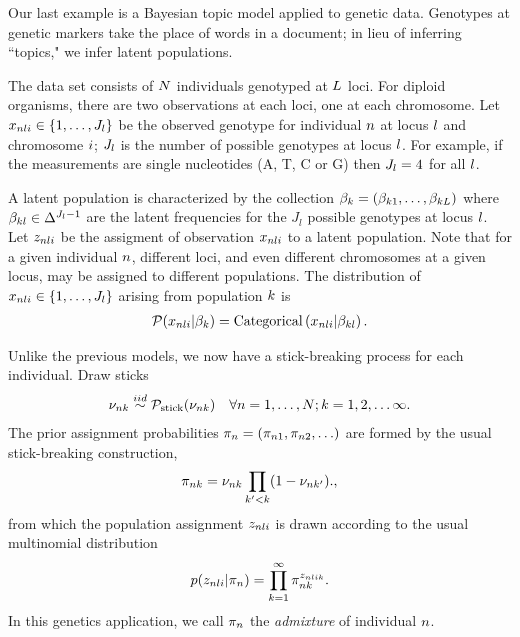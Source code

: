 
Our last example is a Bayesian topic model applied to genetic data.
Genotypes at genetic markers take the place of
words in a document; in lieu of inferring ``topics," we infer latent populations.

\begin{ex}

The data set consists of $N$ individuals genotyped at $L$ loci.
For diploid organisms, there are two observations at each loci, one at each chromosome.
Let $x_{nli}\in\{1, \ldots, J_l\}$ be the observed genotype for
individual $n$ at locus $l$ and chromosome $i$;
$J_l$ is the number of possible genotypes at locus $l$.
For example, if the measurements are single nucleotides (A, T, C or G)
then $J_l = 4$ for all $l$.

A latent population is characterized by the collection
$\beta_k = (\beta_{k1}, \ldots, \beta_{kL})$ where
$\beta_{kl}\in\Delta^{J_l - 1}$ are the latent frequencies for the $J_l$
possible genotypes at locus $l$.
Let $z_{nli}$ be the assigment of observation $x_{nli}$ to a latent population.
Note that for a given individual $n$,
different loci, and even different chromosomes at a given locus,
may be assigned to different populations.
The distribution of $x_{nli}\in\{1, \ldots, J_l\}$ arising from population $k$ is
\begin{align*}
\mathcal{P}(x_{nli} \vert \beta_{k}) =
\mathrm{Categorical}\left(x_{nli}\vert \beta_{kl}\right).
\end{align*}


Unlike the previous models, we now have a stick-breaking process for each individual.
Draw sticks
\begin{align*}
\nu_{nk} \overset{iid}{\sim} \mathcal{P}_{\mathrm{stick}}(\nu_{nk}) \quad \forall n = 1, \ldots, N; k = 1, 2, \ldots \infty.
\end{align*}
The prior assignment probabilities
$\pi_{n} = (\pi_{n1}, \pi_{n2}, \ldots)$
are formed by the usual stick-breaking construction,
%
\begin{align*}
\pi_{nk} = \nu_{nk} \prod_{k' < k} (1 - \nu_{nk'}).,
\end{align*}
%
from which the population assignment $z_{nli}$ is drawn according to the
usual multinomial distribution
%
\begin{align*}
p(z_{nli} | \pi_n) = \prod_{k=1}^{\infty} \pi_{nk}^{z_{nlik}}.
\end{align*}
%
In this genetics application,
we call $\pi_{n}$ the
\textit{admixture} of individual $n$.



\end{ex}
